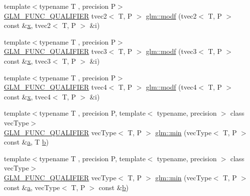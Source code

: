 \begin{DoxyCompactItemize}
\item 
{\footnotesize template$<$typename T , precision P$>$ }\\\mbox{\hyperlink{setup_8hpp_a33fdea6f91c5f834105f7415e2a64407}{G\+L\+M\+\_\+\+F\+U\+N\+C\+\_\+\+Q\+U\+A\+L\+I\+F\+I\+ER}} tvec2$<$ T, P $>$ \mbox{\hyperlink{namespaceglm_aaa2408e8f0b4dc150a54ab6644c17f39}{glm\+::modf}} (tvec2$<$ T, P $>$ const \&\mbox{\hyperlink{glad_8h_a92d0386e5c19fb81ea88c9f99644ab1d}{x}}, tvec2$<$ T, P $>$ \&i)
\item 
{\footnotesize template$<$typename T , precision P$>$ }\\\mbox{\hyperlink{setup_8hpp_a33fdea6f91c5f834105f7415e2a64407}{G\+L\+M\+\_\+\+F\+U\+N\+C\+\_\+\+Q\+U\+A\+L\+I\+F\+I\+ER}} tvec3$<$ T, P $>$ \mbox{\hyperlink{namespaceglm_ab95650561bcf376c17813a1b09e5ff41}{glm\+::modf}} (tvec3$<$ T, P $>$ const \&\mbox{\hyperlink{glad_8h_a92d0386e5c19fb81ea88c9f99644ab1d}{x}}, tvec3$<$ T, P $>$ \&i)
\item 
{\footnotesize template$<$typename T , precision P$>$ }\\\mbox{\hyperlink{setup_8hpp_a33fdea6f91c5f834105f7415e2a64407}{G\+L\+M\+\_\+\+F\+U\+N\+C\+\_\+\+Q\+U\+A\+L\+I\+F\+I\+ER}} tvec4$<$ T, P $>$ \mbox{\hyperlink{namespaceglm_ab562559172a505edca9444da652387dd}{glm\+::modf}} (tvec4$<$ T, P $>$ const \&\mbox{\hyperlink{glad_8h_a92d0386e5c19fb81ea88c9f99644ab1d}{x}}, tvec4$<$ T, P $>$ \&i)
\item 
{\footnotesize template$<$typename T , precision P, template$<$ typename, precision $>$ class vec\+Type$>$ }\\\mbox{\hyperlink{setup_8hpp_a33fdea6f91c5f834105f7415e2a64407}{G\+L\+M\+\_\+\+F\+U\+N\+C\+\_\+\+Q\+U\+A\+L\+I\+F\+I\+ER}} vec\+Type$<$ T, P $>$ \mbox{\hyperlink{group__core__func__common_ga33e66cacf3e991ef1f7d0fce6d073ff9}{glm\+::min}} (vec\+Type$<$ T, P $>$ const \&\mbox{\hyperlink{glad_8h_ac8729153468b5dcf13f971b21d84d4e5}{a}}, T \mbox{\hyperlink{glad_8h_a6eba317e3cf44d6d26c04a5a8f197dcb}{b}})
\item 
{\footnotesize template$<$typename T , precision P, template$<$ typename, precision $>$ class vec\+Type$>$ }\\\mbox{\hyperlink{setup_8hpp_a33fdea6f91c5f834105f7415e2a64407}{G\+L\+M\+\_\+\+F\+U\+N\+C\+\_\+\+Q\+U\+A\+L\+I\+F\+I\+ER}} vec\+Type$<$ T, P $>$ \mbox{\hyperlink{group__core__func__common_ga502b20a691e374cf42dea6e3d126d476}{glm\+::min}} (vec\+Type$<$ T, P $>$ const \&\mbox{\hyperlink{glad_8h_ac8729153468b5dcf13f971b21d84d4e5}{a}}, vec\+Type$<$ T, P $>$ const \&\mbox{\hyperlink{glad_8h_a6eba317e3cf44d6d26c04a5a8f197dcb}{b}})

\end{DoxyCompactItemize}
